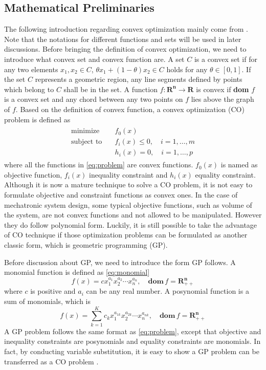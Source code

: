 \subsection{Mathematical Preliminaries}
The following introduction regarding convex optimization mainly come from \cite{gb08}. Note that the notations for different functions and sets will be used in later discussions. Before bringing the definition of convex optimization, we need to introduce what convex set and convex function are. A set $C$ is a convex set if for any two elements $x_1, x_2 \in C$, $\theta x_1+(1-\theta) x_2\in C$ holds for any $\theta \in \left[0,1\right]$. If the set $C$ represents a geometric region, any line segments defined by points which belong to $C$ shall be in the set. A function $f : \mathbf{R^n} \to \mathbf{R}$ is convex if \textbf{dom} $f$ is a convex set and any chord between any two points on $f$ lies above the graph of $f$. Based on the definition of convex function, a convex optimization (CO) problem is defined as 
\begin{align}
\begin{split}
\label{eq:problem}
\text{minimize} \quad  & f_0(x) \\
\text{subject to} \quad & f_i(x) \leq 0,\quad i=1,\ldots,m\\
                  & h_i(x) = 0,\quad i=1,\ldots,p
\end{split}
\end{align}
where all the functions in \ref{eq:problem} are convex functions. $f_0(x)$ is named as objective function, $f_i(x)$ inequality constraint and $h_i(x)$ equality constraint. Although it is now a mature technique to solve a CO problem, it is not easy to formulate objective and constraint functions as convex ones. In the case of mechatronic system design, some typical objective functions, such as volume of the system, are not convex functions and not allowed to be manipulated. However they do follow polynomial form. Luckily, it is still possible to take the advantage of CO technique if those optimization problems can be formulated as another classic form, which is geometric programming (GP).

Before discussion about GP, we need to introduce the form GP follows. A monomial function is defined as \ref{eq:monomial}
\begin{equation}
\label{eq:monomial}
f(x)=cx_1^{a_1}x_2^{a_2}\cdots x_n^{a_n}, \quad \mathbf{dom} \, f=\mathbf{R_{++}^n}
\end{equation}
where $c$ is positive and $a_i$ can be any real number. A posynomial function is a sum of monomials, which is 
\begin{equation}
\label{eq:posynomial}
f(x)=\sum_{k=1}^K c_kx_1^{a_{1k}}x_2^{a_{2k}}\cdots x_n^{a_{nk}}, \quad \mathbf{dom} \, f=\mathbf{R_{++}^n}
\end{equation}
A GP problem follows the same format as \ref{eq:problem}, except that objective and inequality constraints are posynomials and equality constraints are monomials. In fact, by conducting variable substitution, it is easy to show a GP problem can be transferred as a CO problem \cite{gb08}. 

